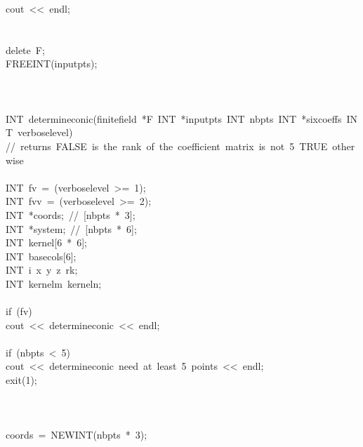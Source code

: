 \begin{tabbing}
\>\>cout\ <<\ endl;\\[0pt]
\>\>\\[0pt]
\\[0pt]
\>delete\ F;\\[0pt]
\>FREEINT(inputpts);\\[0pt]
\\[0pt]
\\[0pt]
\\[0pt]
INT\ determineconic(finitefield\ *F\ INT\ *inputpts\ INT\ nbpts\ INT\ *sixcoeffs\ INT\ verboselevel)\\[0pt]
//\ returns\ FALSE\ is\ the\ rank\ of\ the\ coefficient\ matrix\ is\ not\ 5\ TRUE\ otherwise\\[0pt]
\\[0pt]
\>INT\ fv\ =\ (verboselevel\ >=\ 1);\\[0pt]
\>INT\ fvv\ =\ (verboselevel\ >=\ 2);\\[0pt]
\>INT\ *coords;\ //\ [nbpts\ *\ 3];\\[0pt]
\>INT\ *system;\ //\ [nbpts\ *\ 6];\\[0pt]
\>INT\ kernel[6\ *\ 6];\\[0pt]
\>INT\ basecols[6];\\[0pt]
\>INT\ i\ x\ y\ z\ rk;\\[0pt]
\>INT\ kernelm\ kerneln;\\[0pt]
\\[0pt]
\>if\ (fv)\ \\[0pt]
\>\>cout\ <<\ determineconic\ <<\ endl;\\[0pt]
\>\>\\[0pt]
\>if\ (nbpts\ <\ 5)\ \\[0pt]
\>\>cout\ <<\ determineconic\ need\ at\ least\ 5\ points\ <<\ endl;\\[0pt]
\>\>exit(1);\\[0pt]
\>\>\\[0pt]
\\[0pt]
\\[0pt]
\>coords\ =\ NEWINT(nbpts\ *\ 3);\\[0pt]

\end{tabbing}
